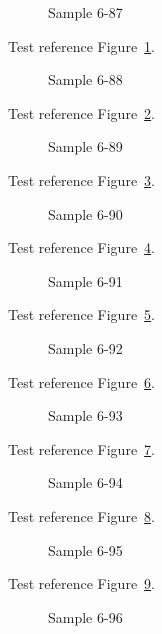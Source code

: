 \begin{figure}[tbhp]
\caption{Sample 6-87}
\label{fig:sample-6-87}
\end{figure}

Test reference Figure~\ref{fig:sample-6-87}.

\begin{figure}[tbhp]
\caption{Sample 6-88}
\label{fig:sample-6-88}
\end{figure}

Test reference Figure~\ref{fig:sample-6-88}.

\begin{figure}[tbhp]
\caption{Sample 6-89}
\label{fig:sample-6-89}
\end{figure}

Test reference Figure~\ref{fig:sample-6-89}.

\begin{figure}[tbhp]
\caption{Sample 6-90}
\label{fig:sample-6-90}
\end{figure}

Test reference Figure~\ref{fig:sample-6-90}.

\begin{figure}[tbhp]
\caption{Sample 6-91}
\label{fig:sample-6-91}
\end{figure}

Test reference Figure~\ref{fig:sample-6-91}.

\begin{figure}[tbhp]
\caption{Sample 6-92}
\label{fig:sample-6-92}
\end{figure}

Test reference Figure~\ref{fig:sample-6-92}.

\begin{figure}[tbhp]
\caption{Sample 6-93}
\label{fig:sample-6-93}
\end{figure}

Test reference Figure~\ref{fig:sample-6-93}.

\begin{figure}[tbhp]
\caption{Sample 6-94}
\label{fig:sample-6-94}
\end{figure}

Test reference Figure~\ref{fig:sample-6-94}.

\begin{figure}[tbhp]
\caption{Sample 6-95}
\label{fig:sample-6-95}
\end{figure}

Test reference Figure~\ref{fig:sample-6-95}.

\begin{figure}[tbhp]
\caption{Sample 6-96}
\label{fig:sample-6-96}
\end{figure}

